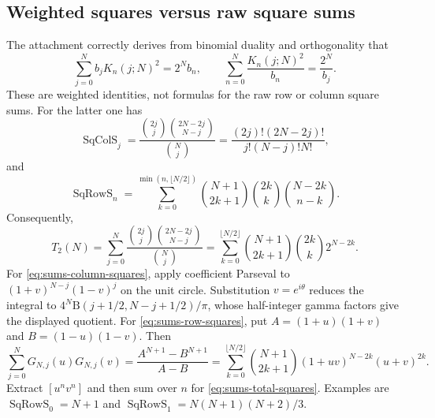 \subsection{Weighted squares versus raw square sums}
The attachment correctly derives from binomial duality and orthogonality that
\begin{equation}\label{eq:sums-weighted-squares}
\sum_{j=0}^N b_jK_n(j;N)^2=2^Nb_n,\qquad
\sum_{n=0}^N\frac{K_n(j;N)^2}{b_n}=\frac{2^N}{b_j}.
\end{equation}
These are weighted identities, not formulas for the raw row or column square sums. For the latter one has
\begin{equation}\label{eq:sums-column-squares}
\operatorname{SqColS}_j=
\frac{\binom{2j}{j}\binom{2N-2j}{N-j}}{\binom Nj}
=\frac{(2j)!(2N-2j)!}{j!(N-j)!N!},
\end{equation}
and
\begin{equation}\label{eq:sums-row-squares}
\operatorname{SqRowS}_n=\sum_{k=0}^{\min(n,\lfloor N/2\rfloor)}
\binom{N+1}{2k+1}\binom{2k}{k}\binom{N-2k}{n-k}.
\end{equation}
Consequently,
\begin{equation}\label{eq:sums-total-squares}
T_2(N)=\sum_{j=0}^N\frac{\binom{2j}{j}\binom{2N-2j}{N-j}}{\binom Nj}
=\sum_{k=0}^{\lfloor N/2\rfloor}\binom{N+1}{2k+1}\binom{2k}{k}2^{N-2k}.
\end{equation}
For \eqref{eq:sums-column-squares}, apply coefficient Parseval to $(1+v)^{N-j}(1-v)^j$ on the unit circle. Substitution $v=e^{i\theta}$ reduces the integral to
$4^N\mathrm B(j+1/2,N-j+1/2)/\pi$, whose half-integer gamma factors give the displayed quotient.
For \eqref{eq:sums-row-squares}, put $A=(1+u)(1+v)$ and $B=(1-u)(1-v)$. Then
\[
\sum_{j=0}^N G_{N,j}(u)G_{N,j}(v)
=\frac{A^{N+1}-B^{N+1}}{A-B}
=\sum_{k=0}^{\lfloor N/2\rfloor}\binom{N+1}{2k+1}(1+uv)^{N-2k}(u+v)^{2k}.
\]
Extract $[u^nv^n]$ and then sum over $n$ for \eqref{eq:sums-total-squares}. Examples are $\operatorname{SqRowS}_0=N+1$ and $\operatorname{SqRowS}_1=N(N+1)(N+2)/3$.

